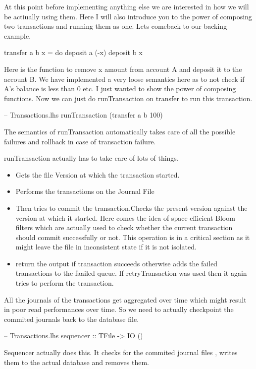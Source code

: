 \documentclass[11pt,a4paper]{article}
\begin{document}
At this point before implementing anything else we are interested in how
we will be actiually using them. Here I will also introduce you to the
power of composing two transactions and running them as one. Lets
comeback to our backing example. \\
\begin{code}[name=Transactions]
transfer a b x = do 
  deposit a (-x) 
  deposit b x
\end{code}

Here is the function to remove x amount from account A and deposit it to
the account B. We have implemented a very loose semantics here as to not
check if A's balance is less than 0 etc. I just wanted to show the power
of composing functions. Now we can just do runTransaction on transfer to
run this transaction. \\
\begin{code}[name=Transactions]
-- Transactions.lhs
runTransaction (transfer a b 100)
\end{code}
The semantics of runTransaction automatically
takes care of all the possible failures and rollback in case of
transaction failure.

runTransaction actually has to take care of lots of things. 
\begin{itemize}
\item Gets the file Version at which the transaction started.
\item Performs the transactions on the Journal File 
\item Then tries to commit the transaction.Checks the present version against the version at which it started. Here comes the idea of space efficient Bloom filters which are actually used to check whether the current transaction should commit successfully or not. This operation is in a critical section as it might leave the file in inconsistent state if it is not isolated. 
\item return the output if transaction succeeds otherwise adds the failed transactions to the faailed queue. If retryTransaction was used then it again tries to perform the transaction. 
\end{itemize}
All the journals of the transactions get aggregated over time which might result in poor read performances over time. So we need to actually checkpoint the commited journals back to the database file. \\
\begin{code}[name=Transactions]
-- Transactions.lhs
sequencer :: TFile -> IO () 
\end{code}
Sequencer actually does this. It checks for the commited journal files , writes them to the actual database and removes them. 
\end{document}
